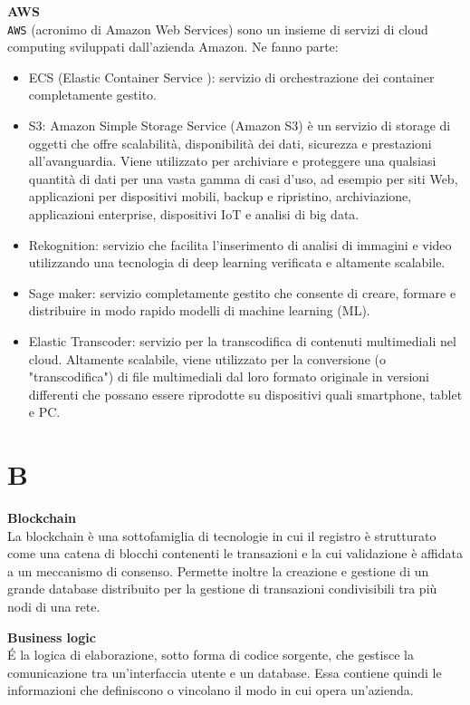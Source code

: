 \documentclass[a4paper, oneside, openany, dvipsnames, table, 12pt]{article}
\begin{document}
\textbf{AWS} \\
\texttt{AWS} (acronimo di Amazon Web Services) sono un insieme di servizi di cloud computing sviluppati dall'azienda Amazon. Ne fanno parte: 
\begin{itemize}
\item ECS (Elastic Container Service ): servizio di orchestrazione dei container completamente gestito.
\item S3: Amazon Simple Storage Service (Amazon S3) è un servizio di storage di oggetti che offre scalabilità, disponibilità dei dati, sicurezza e prestazioni all'avanguardia. Viene utilizzato per archiviare e proteggere una qualsiasi quantità di dati per una vasta gamma di casi d'uso, ad esempio per siti Web, applicazioni per dispositivi mobili, backup e ripristino, archiviazione, applicazioni enterprise, dispositivi IoT e analisi di big data.
\item Rekognition: servizio che facilita l'inserimento di analisi di immagini e video utilizzando una tecnologia di deep learning verificata e altamente scalabile.
\item Sage maker: servizio completamente gestito che consente di creare, formare e distribuire in modo rapido modelli di machine learning (ML).
\item Elastic Transcoder: servizio per la transcodifica di contenuti multimediali nel cloud. Altamente scalabile, viene utilizzato per la conversione (o "transcodifica") di file multimediali dal loro formato originale in versioni differenti che possano essere riprodotte su dispositivi quali smartphone, tablet e PC.
\end{itemize}

\newpage
\section{B}
\label{par:blockC}
\textbf{Blockchain} \\
La blockchain è una sottofamiglia di tecnologie in cui il registro è strutturato come una catena di blocchi contenenti le transazioni e la cui validazione è affidata a un meccanismo di consenso. 
Permette inoltre la creazione e gestione di un grande database distribuito per la gestione di transazioni condivisibili tra più nodi di una rete. 

\textbf{Business logic} \\
\'E la logica di elaborazione, sotto forma di codice sorgente, che gestisce la comunicazione tra un'interfaccia utente e un database.
Essa contiene quindi le informazioni che definiscono o vincolano il modo in cui opera un'azienda.
\end{document}
